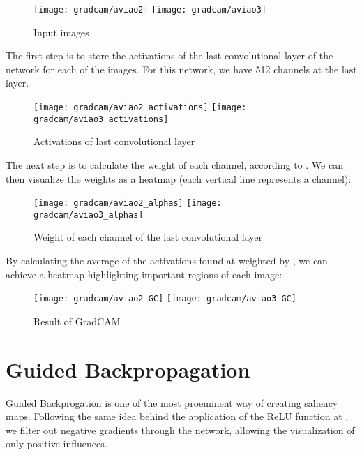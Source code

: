 \begin{figure} [H]
    \centering
    \texttt{[image: gradcam/aviao2]}
    \texttt{[image: gradcam/aviao3]}
    \caption{Input images}
\end{figure}

The first step is to store the activations of the last convolutional layer of the network for each of the images. For this network, we have 512 channels at the last layer.


\begin{figure} [H]
    \centering
    \texttt{[image: gradcam/aviao2\_activations]}
    \texttt{[image: gradcam/aviao3\_activations]}
    \caption{Activations of last convolutional layer}
    \label{fig:activations}
\end{figure}

The next step is to calculate the weight of each channel, according to \cite{eq:alpha}. We can then visualize the weights as a heatmap (each vertical line represents a channel):

\begin{figure} [H]
    \centering
    \texttt{[image: gradcam/aviao2\_alphas]}
    \texttt{[image: gradcam/aviao3\_alphas]}
    \caption{Weight of each channel of the last convolutional layer}
    \label{fig:weights}
\end{figure}

By calculating the average of the activations found at \cite{fig:actiovations} weighted by \label{fig:weights}, we can achieve a heatmap highlighting important regions of each image:

\begin{figure}[H]
    \centering
    \texttt{[image: gradcam/aviao2-GC]}
    \texttt{[image: gradcam/aviao3-GC]}
    \caption{Result of GradCAM}
\end{figure}


\section{Guided Backpropagation}

Guided Backprogation is one of the most proeminent way of creating saliency maps. Following the same idea behind the application of the ReLU function at \cite{eq:heatmap}, we filter out negative gradients through the network, allowing the visualization of only positive influences.

